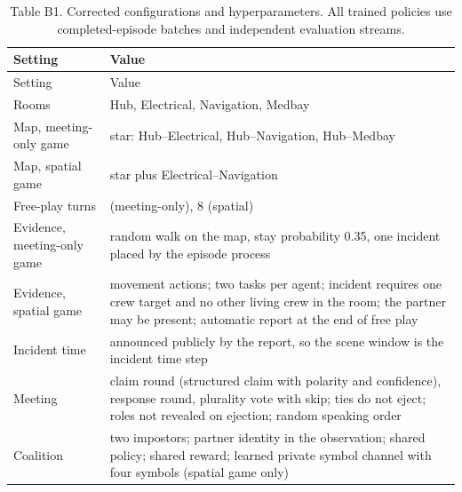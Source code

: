 \documentclass[
  12pt,
]{article}
\begin{document}
\FloatBarrier

\begin{longtable}[]{@{}
  >{\raggedright\arraybackslash}p{}
  >{\raggedright\arraybackslash}p{}@{}}
\caption{Table B1. Corrected configurations and hyperparameters. All
trained policies use completed-episode batches and independent
evaluation streams.}\label{tab:B1}\tabularnewline
\toprule\noalign{}
\begin{minipage}[b]{\linewidth}\raggedright
Setting
\end{minipage} & \begin{minipage}[b]{\linewidth}\raggedright
Value
\end{minipage} \\
\midrule\noalign{}
\endfirsthead
\toprule\noalign{}
\begin{minipage}[b]{\linewidth}\raggedright
Setting
\end{minipage} & \begin{minipage}[b]{\linewidth}\raggedright
Value
\end{minipage} \\
\midrule\noalign{}
\endhead
\bottomrule\noalign{}
\endlastfoot
Rooms & Hub, Electrical, Navigation, Medbay \\
Map, meeting-only game & star: Hub--Electrical, Hub--Navigation,
Hub--Medbay \\
Map, spatial game & star plus Electrical--Navigation \\
Free-play turns & 6 (meeting-only), 8 (spatial) \\
Evidence, meeting-only game & random walk on the map, stay probability
0.35, one incident placed by the episode process \\
Evidence, spatial game & movement actions; two tasks per agent; incident
requires one crew target and no other living crew in the room; the
partner may be present; automatic report at the end of free play \\
Incident time & announced publicly by the report, so the scene window is
the incident time step \\
Meeting & claim round (structured claim with polarity and confidence),
response round, plurality vote with skip; ties do not eject; roles not
revealed on ejection; random speaking order \\
Coalition & two impostors; partner identity in the observation; shared
policy; shared reward; learned private symbol channel with four symbols
(spatial game only) \\

\end{longtable}
\end{document}
